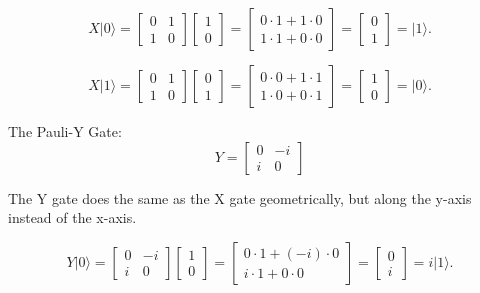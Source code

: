 \documentclass[12pt]{article}
\begin{document}
$$
X \vert 0 \rangle = 
\begin{bmatrix} 0 & 1 \\ 1 & 0 \end{bmatrix}
\begin{bmatrix} 1 \\ 0 \end{bmatrix}
=
\begin{bmatrix} 0\cdot1 + 1\cdot0 \\ 1\cdot1 + 0\cdot0 \end{bmatrix}
=
\begin{bmatrix} 0 \\ 1 \end{bmatrix} = \vert 1 \rangle.
$$

$$
X \vert 1 \rangle = 
\begin{bmatrix} 0 & 1 \\ 1 & 0 \end{bmatrix}
\begin{bmatrix} 0 \\ 1 \end{bmatrix}
=
\begin{bmatrix} 0\cdot 0 + 1\cdot 1 \\ 1\cdot 0 + 0\cdot 1 \end{bmatrix}
=
\begin{bmatrix} 1 \\ 0 \end{bmatrix}
= \vert 0 \rangle.
$$


The Pauli-Y Gate:
$$
Y = \begin{bmatrix}
0 & -i \\
i & 0
\end{bmatrix}
$$

The Y gate does the same as the X gate geometrically, but along the y-axis instead of the x-axis. 



$$
Y \vert 0 \rangle = 
\begin{bmatrix} 0 & -i \\ i & 0 \end{bmatrix}
\begin{bmatrix} 1 \\ 0 \end{bmatrix}
=
\begin{bmatrix} 0\cdot 1 + (-i)\cdot 0 \\ i\cdot 1 + 0\cdot 0 \end{bmatrix}
=
\begin{bmatrix} 0 \\ i \end{bmatrix}
= i \vert 1 \rangle.
$$
\end{document}
